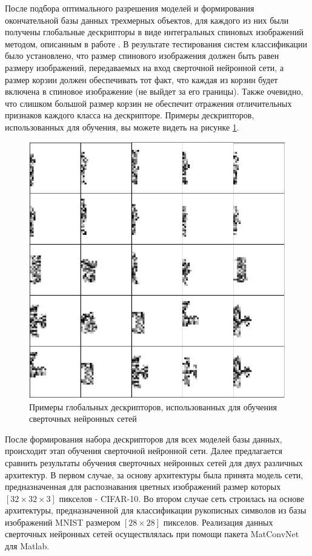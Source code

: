 \documentclass[14pt]{article}
\numberwithin{figure}{section}
\numberwithin{equation}{section}
\begin{document}
 После подбора оптимального разрешения моделей и формирования окончательной базы данных трехмерных объектов, для каждого из них были получены глобальные дескрипторы в виде интегральных спиновых изображений методом, описанным в работе \cite{Chernikoff}. В результате тестирования систем классификации было установлено, что размер спинового изображения должен быть равен размеру изображений, передаваемых на вход сверточной нейронной сети, а размер корзин должен обеспечивать тот факт, что каждая из корзин будет включена в спиновое изображение (не выйдет за его границы). Также очевидно, что слишком большой размер корзин не обеспечит отражения отличительных признаков каждого класса на дескрипторе. Примеры дескрипторов, использованных для обучения, вы можете видеть на рисунке \ref{ris:8}.

 \begin{figure}[h]
 	\begin{center}
 		\includegraphics[scale=0.75] {8.JPG}
 		\caption{Примеры глобальных дескрипторов, использованных для обучения сверточных нейронных сетей}
 		\label{ris:8}
 	\end{center}
 \end{figure}

После формирования набора дескрипторов для всех моделей базы данных, происходит этап обучения сверточной нейронной сети. Далее предлагается сравнить результаты обучения сверточных нейронных сетей для двух различных архитектур. В первом случае, за основу архитектуры была принята модель сети, предназначенная для распознавания цветных изображений размер которых $[32 \times 32 \times 3]$ пикселов - CIFAR-10. Во втором случае сеть строилась на основе архитектуры, предназначенной для классификации рукописных символов из базы изображений MNIST размером $[28 \times 28]$ пикселов. Реализация данных сверточных нейронных сетей осуществлялась при помощи пакета MatConvNet для Matlab.
\end{document}
